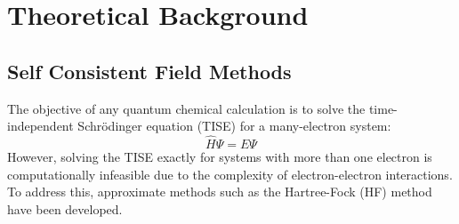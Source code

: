 \chapter{Theoretical Background}\label{ch:theory}

\section{Self Consistent Field Methods} \label{sec:SCF}
The objective of any quantum chemical calculation is to solve the time-independent Schrödinger equation (TISE) for a many-electron system:
\begin{equation}\label{eq:TISE}
    \hat{H} \Psi = E \Psi
\end{equation}
However, solving the TISE exactly for systems with more than one electron is computationally infeasible due to the complexity of electron-electron interactions. To address this, approximate methods such as the Hartree-Fock (HF) method have been developed.


